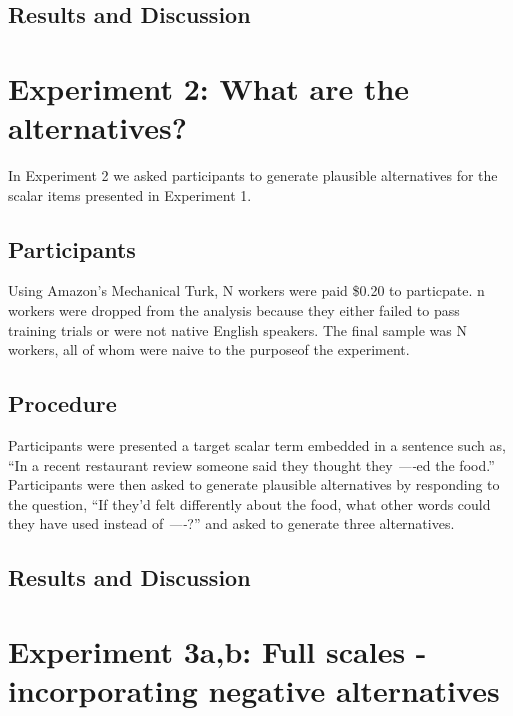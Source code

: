 \documentclass[10pt, letterpaper]{article}
\begin{document}
\subsection{Results and Discussion}\label{results-and-discussion}

\section{Experiment 2: What are the
alternatives?}\label{experiment-2-what-are-the-alternatives}

In Experiment 2 we asked participants to generate plausible alternatives
for the scalar items presented in Experiment 1.

\subsection{Participants}\label{participants-1}

Using Amazon's Mechanical Turk, N workers were paid \$0.20 to
particpate. n workers were dropped from the analysis because they either
failed to pass training trials or were not native English speakers. The
final sample was N workers, all of whom were naive to the purposeof the
experiment.

\subsection{Procedure}\label{procedure-1}

Participants were presented a target scalar term embedded in a sentence
such as, ``In a recent restaurant review someone said they thought they
\emph{----}ed the food.'' Participants were then asked to generate
plausible alternatives by responding to the question, ``If they'd felt
differently about the food, what other words could they have used
instead of \emph{----}?'' and asked to generate three alternatives.

\subsection{Results and Discussion}\label{results-and-discussion-1}

\section{Experiment 3a,b: Full scales - incorporating negative
alternatives}\label{experiment-3ab-full-scales---incorporating-negative-alternatives}
\end{document}
